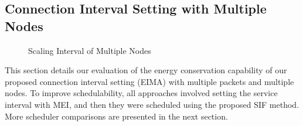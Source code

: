 \documentclass[10pt,journal,compsoc]{IEEEtran}
\begin{document}

\subsection{Connection Interval Setting with Multiple Nodes}\label{sec:exp-scaleinterval}

\begin{figure*}[!tbhp]
\begin{minipage}[b]{\linewidth}
\vspace{-0.5em}
\centering
{}\vspace{-0.5em}
\caption{Scaling Interval of Multiple Nodes} \label{fig:Exper_Interval} %
\end{minipage}
\end{figure*}


This section details our evaluation of the energy conservation capability of our proposed connection interval setting (EIMA) with multiple packets and multiple nodes. To improve schedulability, all approaches involved setting the service interval with MEI, and then they were scheduled using the proposed SIF method. More scheduler comparisons are presented in the next section.
\end{document}

